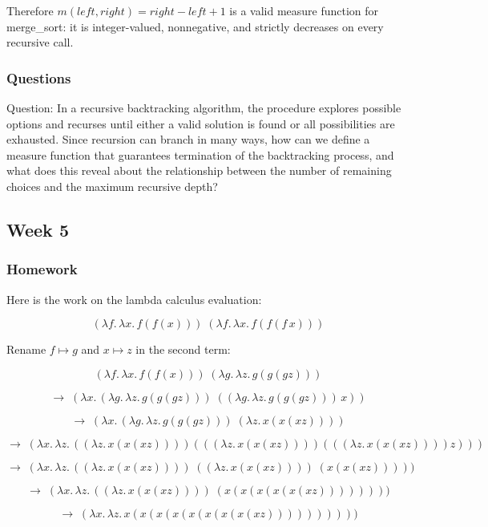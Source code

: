 \documentclass{article}
\theoremstyle{theorem}
\theoremstyle{definition}
\theoremstyle{remark}
\begin{document}
Therefore $m(left,right) = right - left + 1$ is a valid measure function for merge\_sort: it is integer-valued, nonnegative, and strictly decreases on every recursive call.

\subsubsection{Questions}

Question: In a recursive backtracking algorithm, the procedure explores possible options and recurses until either a valid solution is found or all possibilities are exhausted. Since recursion can branch in many ways, how can we define a measure function that guarantees termination of the backtracking process, and what does this reveal about the relationship between the number of remaining choices and the maximum recursive depth?

\subsection{Week 5}

\subsubsection{Homework}

Here is the work on the lambda calculus evaluation:

\[
(\lambda f.\,\lambda x.\,f(f(x))) \; (\lambda f.\,\lambda x.\,f(f(f \, x)))
\]

Rename \(f \mapsto g\) and \(x \mapsto z\) in the second term:

\[
(\lambda f.\,\lambda x.\,f(f(x))) \; (\lambda g.\,\lambda z.\,g(g(g z)))
\]

\[
\to \; (\lambda x.\,(\lambda g.\,\lambda z.\,g(g(g z))) \; ((\lambda g.\,\lambda z.\,g(g(g z))) \, x))
\]

\[
\to \; (\lambda x.\,(\lambda g.\,\lambda z.\,g(g(g z))) \; (\lambda z.\,x(x(x z))))
\]

\[
\to \; (\lambda x.\,\lambda z.\,((\lambda z.\,x(x(x z))))(((\lambda z.\,x(x(x z))))(((\lambda z.\,x(x(x z)))) z)))
\]

\[
\to \; (\lambda x.\,\lambda z.\,((\lambda z.\,x(x(x z)))) \; ((\lambda z.\,x(x(x z)))) \; (x(x(x z)))))
\]

\[
\to \; (\lambda x.\,\lambda z.\,((\lambda z.\,x(x(x z)))) \; (x(x(x(x(x(x z))))))))
\]

\[
\to \; (\lambda x.\,\lambda z.\,x(x(x(x(x(x(x(x(x z))))))))))
\]
\end{document}
